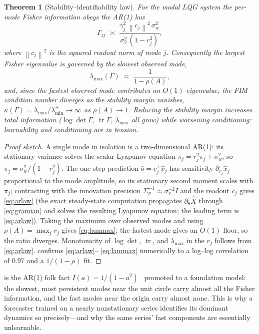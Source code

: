 \documentclass[10pt]{article}
\theoremstyle{plain}
\newtheorem{theorem}{Theorem}[section]
\theoremstyle{definition}
\theoremstyle{remark}
\DeclareMathOperator{\tr}{tr}
\newcommand{\Gam}{\Gamma}
\newcommand{\norm}[1]{\left\lVert #1 \right\rVert}
\begin{document}
\begin{theorem}[Stability--identifiability law]\label{thm:stability}
For the modal LQG system the per-mode Fisher information obeys the AR(1) law
\begin{equation}
 \Gam_{jj}\;\asymp\;\frac{\gamma_j^2\,\norm{c_j}^2\,\sigma_w^2}
                          {\sigma_v^2\,(1-r_j^2)},
 \label{eq:arlaw}
\end{equation}
where $\norm{c_j}^2$ is the squared readout norm of mode $j$. Consequently the
largest Fisher eigenvalue is governed by the slowest observed mode,
\begin{equation}
 \lambda_{\max}(\Gam)\;\asymp\;\frac{1}{1-\rho(A)},
 \label{eq:lammax}
\end{equation}
and, since the fastest observed mode contributes an $O(1)$ eigenvalue, the FIM
condition number diverges as the stability margin vanishes,
$\kappa(\Gam)=\lambda_{\max}/\lambda_{\min}^{+}\to\infty$ as $\rho(A)\to1$.
Reducing the stability margin \emph{increases} total information
($\log\det\Gam$, $\tr\Gam$, $\lambda_{\max}$ all grow) while \emph{worsening}
conditioning: learnability and conditioning are in tension.
\end{theorem}

\begin{proof}[Proof sketch]
A single mode in isolation is a two-dimensional AR(1): its stationary variance
solves the scalar Lyapunov equation $\pi_j=r_j^2\pi_j+\sigma_w^2$, so
$\pi_j=\sigma_w^2/(1-r_j^2)$. The one-step prediction $\hat o=c_j^\top\hat x_j$
has sensitivity $\partial_{r_j}\hat x_j$ proportional to the mode amplitude, so
its stationary second moment scales with $\pi_j$; contracting with the
innovation precision $\Sigma_\nu^{-1}\!\approx\!\sigma_v^{-2}I$ and the readout
$c_j$ gives \eqref{eq:arlaw} (the exact steady-state computation propagates
$\partial_\theta\hat X$ through \eqref{eq:gramian} and solves the resulting
Lyapunov equation; the leading term is \eqref{eq:arlaw}). Taking the maximum over
observed modes and using $\rho(A)=\max_j r_j$ gives \eqref{eq:lammax}; the
fastest mode gives an $O(1)$ floor, so the ratio diverges. Monotonicity of
$\log\det$, $\tr$, and $\lambda_{\max}$ in the $r_j$ follows from
\eqref{eq:arlaw}.  confirms \eqref{eq:arlaw}--%
\eqref{eq:lammax} numerically to a log--log correlation of $0.97$ and a
$1/(1-\rho)$ fit.
\end{proof}

 is the AR(1) folk fact $I(a)=1/(1-a^2)$~\cite{phillips1987}
promoted to a foundation model: the slowest, most persistent modes near the unit
circle carry almost all the Fisher information, and the fast modes near the
origin carry almost none. This is why a forecaster trained on a nearly
nonstationary series identifies its dominant dynamics so precisely---and why the
same series' fast components are essentially unlearnable.
\end{document}
